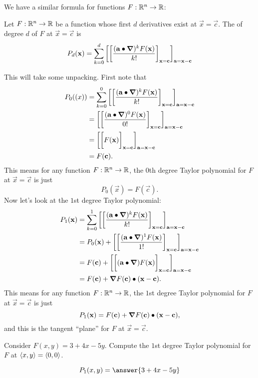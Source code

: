 \documentclass{ximera}
\begin{document}
We have a similar formula for functions $F:\mathbb R^n\to \mathbb R$:
\begin{definition}
  Let $F:\mathbb R^n\to\mathbb R$ be a function whose first $d$ derivatives exist at
  $\vec{x}=\vec{c}$.  The  of degree $d$ of $F$
  at $\vec{x}=\vec{c}$ is
  \[
  P_d(\mathbf{x}) = \sum_{k=0}^d \bigg[ \bigg[ \frac{(\mathbf{a}\bullet \boldsymbol\nabla)^k F(\mathbf{x})}{k!} \bigg]_{\mathbf{x}=\mathbf{c}} \bigg]_{\mathbf{a}=\mathbf{x}-\mathbf{c}}
  \]
\end{definition}
This will take some unpacking. First note that
\begin{align*}
  P_0(\mathbf(x)) &= \sum_{k=0}^0 \bigg[ \bigg[ \frac{(\mathbf{a}\bullet \boldsymbol\nabla)^k F(\mathbf{x})}{k!} \bigg]_{\mathbf{x}=\mathbf{c}} \bigg]_{\mathbf{a}=\mathbf{x}-\mathbf{c}}\\
  &=\bigg[ \bigg[ \frac{(\mathbf{a}\bullet \boldsymbol\nabla)^0 F(\mathbf{x})}{0!} \bigg]_{\mathbf{x}=\mathbf{c}} \bigg]_{\mathbf{a}=\mathbf{x}-\mathbf{c}}\\
  &=\bigg[ \bigg[ F(\mathbf{x}) \bigg]_{\mathbf{x}=\mathbf{c}} \bigg]_{\mathbf{a}=\mathbf{x}-\mathbf{c}}\\
  &=F(\mathbf{c}).
\end{align*}
This means for any function $F:\mathbb R^n\to\mathbb R$, the $0$th degree Taylor
polynomial for $F$ at $\vec{x}=\vec{c}$ is just
\[
P_0(\vec{x})=F(\vec{c}).
\]
Now let's look at the $1$st degree Taylor polynomial:
\begin{align*}
  P_1(\mathbf{x})&= \sum_{k=0}^1 \bigg[ \bigg[ \frac{(\mathbf{a}\bullet \boldsymbol\nabla)^k F(\mathbf{x})}{k!} \bigg]_{\mathbf{x}=\mathbf{c}} \bigg]_{\mathbf{a}=\mathbf{x}-\mathbf{c}}\\
  &=P_0(\mathbf{x}) + \bigg[ \bigg[ \frac{(\mathbf{a}\bullet \boldsymbol\nabla)^1 F(\mathbf{x})}{1!} \bigg]_{\mathbf{x}=\mathbf{c}} \bigg]_{\mathbf{a}=\mathbf{x}-\mathbf{c}}\\
  &=F(\mathbf{c}) + \bigg[ \bigg[ (\mathbf{a}\bullet \boldsymbol\nabla) F(\mathbf{x}) \bigg]_{\mathbf{x}=\mathbf{c}} \bigg]_{\mathbf{a}=\mathbf{x}-\mathbf{c}}\\
  &= F(\mathbf{c}) + \boldsymbol\nabla F(\mathbf{c})\bullet (\mathbf{x}-\mathbf{c}).
\end{align*}
This means for any function $F:\mathbb R^n\to\mathbb R$, the $1$st degree Taylor
polynomial for $F$ at $\vec{x}=\vec{c}$ is just
\[
P_1(\mathbf{x}) = F(\mathbf{c}) + \boldsymbol\nabla F(\mathbf{c})\bullet (\mathbf{x}-\mathbf{c}),
\]
and this is the tangent ``plane'' for $F$ at $\vec{x}= \vec{c}$.


\begin{question}
  Consider $F(x,y)= 3+4x-5y$. Compute the $1$st degree Taylor
  polynomial for $F$ at $\left\langle x,y\right\rangle =\left\langle 0,0\right\rangle$.
  \begin{prompt}
    \[
    P_1(x,y) = \answer{3+4x-5y}
    \]
  \end{prompt}
\end{question}
\end{document}
